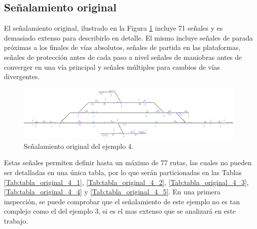 \subsection{Señalamiento original}

    El señalamiento original, ilustrado en la Figura \ref{fig:EJ4_2} incluye 71 señales y es demasiado extenso para describirlo en detalle. El mismo incluye señales de parada próximas a los finales de vías absolutos, señales de partida en las plataformas, señales de protección antes de cada paso a nivel  señales de maniobras antes de converger en una vía principal y señales múltiples para cambios de vías divergentes.
    
    \begin{figure}[H]
    	\centering
    	\includegraphics[width=1\textwidth]{resultados-obtenidos/ejemplo4/images/4_original.png}
    	\centering\caption{Señalamiento original del ejemplo 4.}
    	\label{fig:EJ4_2}
    \end{figure}
    
    Estas señales permiten definir hasta un máximo de 77 rutas, las cuales no pueden ser detalladas en una única tabla, por lo que serán particionadas en las Tablas \ref{Tab:tabla_original_4_1}, \ref{Tab:tabla_original_4_2}, \ref{Tab:tabla_original_4_3}, \ref{Tab:tabla_original_4_4} y \ref{Tab:tabla_original_4_5}. En una primera inspección, se puede comprobar que el señalamiento de este ejemplo no es tan complejo como el del ejemplo 3, si es el mas extenso que se analizará en este trabajo.    
    
